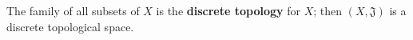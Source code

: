 The family of all subsets of $X$ is the \textbf{discrete topology} for $X$; then $(X, \mathfrak{J})$ is a discrete topological space.
